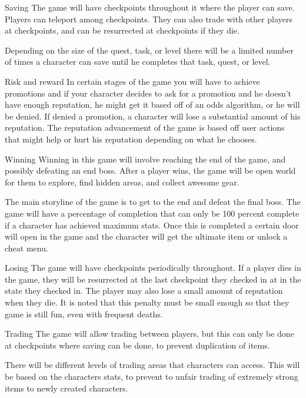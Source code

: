 \documentclass[12pt]{article}
\begin{document}
\begin{section}{Saving}
The game will have checkpoints throughout it where the player can save.  Players
can teleport among checkpoints. They can also trade with other players at
checkpoints, and can be resurrected at checkpoints if they die.

Depending on the size of the quest, task, or level there will be a limited
number of times a character can save until he completes that task, quest, or
level.
\end{section}

\begin{section}{Risk and reward}
In certain stages of the game you will have to achieve promotions and if your
character decides to ask for a promotion and he doesn’t have enough reputation,
he might get it based off of an odds algorithm, or he will be denied. If denied
a promotion, a character will lose a substantial amount of his reputation. The
reputation advancement of the game is based off user actions that might help or
hurt his reputation depending on what he chooses.
\end{section}

\begin{section}{Winning}
Winning in this game will involve reaching the end of the game, and possibly
defeating an end boss. After a player wins, the game will be open world for them
to explore, find hidden areas, and collect awesome gear.

The main storyline of the game is to get to the end and defeat the final boss.
The game will have a percentage of completion that can only be 100 percent
complete if a character has achieved maximum stats. Once this is completed a
certain door will open in the game and the character will get the ultimate item
or unlock a cheat menu.
\end{section}

\begin{section}{Losing}
The game will have checkpoints periodically throughout. If a player dies in the
game, they will be resurrected at the last checkpoint they
checked in at in the state they checked in. The player may also lose
a small amount of reputation when they die. It is noted that this penalty must
be small enough so that they game is still fun, even with frequent deaths.
\end{section}

\begin{section}{Trading}
The game will allow trading between players, but this can only be done
at checkpoints where saving can be done, to prevent duplication of items.

There will be different levels of trading areas that characters can access. This
will be based on the characters stats, to prevent to unfair trading of extremely
strong items to newly created characters.
\end{section}
\end{document}
